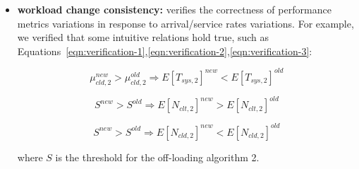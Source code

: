 \begin{itemize}
	\item \textbf{workload change consistency:} verifies the correctness of performance metrics variations in response to arrival/service rates variations. For example, we verified that some intuitive relations hold true, such as Equations~\ref{eqn:verification-1},\ref{eqn:verification-2},\ref{eqn:verification-3}:
	
	\begin{equation}
		\mu_{cld,2}^{new} > \mu_{cld,2}^{old} \Rightarrow E[T_{sys,2}]^{new} < E[T_{sys,2}]^{old}
	\label{eqn:verification-1}
	\end{equation}
	
	\begin{equation}
	S^{new} > S^{old} \Rightarrow E[N_{clt,2}]^{new} > E[N_{clt,2}]^{old}
	\label{eqn:verification-2}
	\end{equation}
	
	\begin{equation}
	S^{new} > S^{old} \Rightarrow E[N_{cld,2}]^{new} < E[N_{cld,2}]^{old}
	\label{eqn:verification-3}
	\end{equation}
	
	where $S$ is the threshold for the off-loading algorithm 2.
\end{itemize}